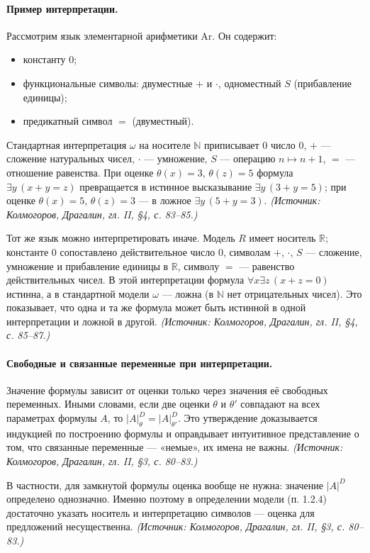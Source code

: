\documentclass[a4paper,12pt]{article}
\begin{document}
\paragraph{Пример интерпретации.} Рассмотрим язык элементарной арифметики \(\mathrm{Ar}\). Он содержит:
\begin{itemize}
\item константу \(0\);
\item функциональные символы: двуместные \(+\) и \(\cdot\), одноместный \(S\) (прибавление единицы);
\item предикатный символ \(=\) (двуместный).
\end{itemize}
Стандартная интерпретация \(\omega\) на носителе \(\mathbb{N}\) приписывает \(0\) число \(0\), \(+\) --- сложение натуральных чисел, \(\cdot\) --- умножение, \(S\) --- операцию \(n\mapsto n+1\), \(=\) --- отношение равенства. При оценке \(\theta(x)=3\), \(\theta(z)=5\) формула \(\exists y\,(x+y=z)\) превращается в истинное высказывание \(\exists y\,(3+y=5)\); при оценке \(\theta(x)=5\), \(\theta(z)=3\) --- в ложное \(\exists y\,(5+y=3)\).
\textit{(Источник: Колмогоров, Драгалин, гл. II, §4, с. 83--85.)}

Тот же язык можно интерпретировать иначе. Модель \(R\) имеет носитель \(\mathbb{R}\); константе \(0\) сопоставлено действительное число \(0\), символам \(+\), \(\cdot\), \(S\) --- сложение, умножение и прибавление единицы в \(\mathbb{R}\), символу \(=\) --- равенство действительных чисел. В этой интерпретации формула \(\forall x\exists z\,(x+z=0)\) истинна, а в стандартной модели \(\omega\) --- ложна (в \(\mathbb{N}\) нет отрицательных чисел). Это показывает, что одна и та же формула может быть истинной в одной интерпретации и ложной в другой.
\textit{(Источник: Колмогоров, Драгалин, гл. II, §4, с. 85--87.)}

\paragraph{Свободные и связанные переменные при интерпретации.} Значение формулы зависит от оценки только через значения её свободных переменных. Иными словами, если две оценки \(\theta\) и \(\theta'\) совпадают на всех параметрах формулы \(A\), то \(|A|^D_\theta=|A|^D_{\theta'}\). Это утверждение доказывается индукцией по построению формулы и оправдывает интуитивное представление о том, что связанные переменные --- «немые», их имена не важны.
\textit{(Источник: Колмогоров, Драгалин, гл. II, §3, с. 80--83.)}

В частности, для замкнутой формулы оценка вообще не нужна: значение \(|A|^D\) определено однозначно. Именно поэтому в определении модели (п. 1.2.4) достаточно указать носитель и интерпретацию символов --- оценка для предложений несущественна.
\textit{(Источник: Колмогоров, Драгалин, гл. II, §3, с. 80--83.)}
\end{document}
